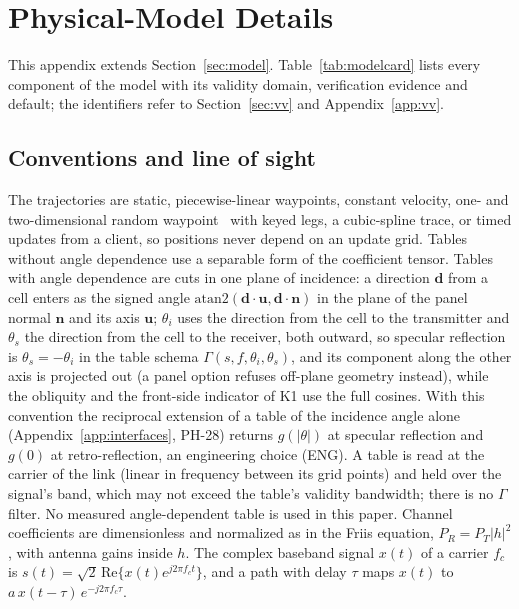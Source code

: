 \section{Physical-Model Details}\label{app:model}

This appendix extends Section~\ref{sec:model}. Table~\ref{tab:modelcard}
lists every component of the model with its validity domain, verification evidence and
default; the identifiers refer to Section~\ref{sec:vv} and Appendix~\ref{app:vv}.



\subsection{Conventions and line of sight}
The trajectories are static, piecewise-linear waypoints, constant velocity, one-
and two-dimensional random waypoint~\cite{Bettstetter2003RWP} with keyed legs, a cubic-spline
trace, or timed updates from a client, so positions never depend on an update grid. Tables
without angle dependence use a separable form of
the coefficient tensor. Tables with angle dependence are cuts in one plane of incidence: a
direction $\mathbf d$ from a cell enters as the signed angle
$\mathrm{atan2}(\mathbf d\cdot\mathbf u,\mathbf d\cdot\mathbf n)$ in the plane of the panel
normal $\mathbf n$ and its axis $\mathbf u$; $\theta_i$ uses the direction from the cell to
the transmitter and $\theta_s$ the direction from the cell to the receiver, both outward, so
specular reflection is $\theta_s=-\theta_i$ in the table schema $\Gamma(s,f,\theta_i,\theta_s)$, and its component along the other axis is
projected out (a panel option refuses off-plane geometry instead), while the obliquity and the
front-side indicator of K1 use the full cosines. With this convention the reciprocal extension of a table of the incidence angle alone
(Appendix~\ref{app:interfaces}, PH-28) returns $g(|\theta|)$ at specular reflection and
$g(0)$ at retro-reflection, an engineering choice (ENG). A table is read
at the carrier of the link (linear in frequency between its grid points) and held over the
signal's band, which may not exceed the table's validity bandwidth; there is no $\Gamma$ filter.
No measured angle-dependent table is used in this paper. Channel coefficients are dimensionless and normalized as in the Friis
equation, $P_R=P_T|h|^2$, with antenna gains inside $h$. The complex baseband signal $x(t)$
of a carrier $f_c$ is $s(t)=\sqrt2\,\mathrm{Re}\{x(t)e^{j2\pi f_ct}\}$, and a path with delay
$\tau$ maps $x(t)$ to $a\,x(t-\tau)\,e^{-j2\pi f_c\tau}$.

